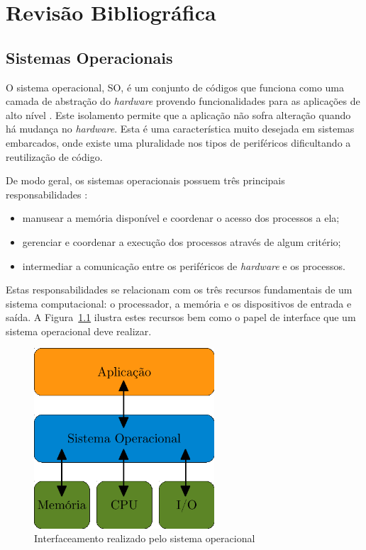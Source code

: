 \documentclass[12pt,openright,oneside,a4paper,brazil]{abntex2}
\begin{document}
\chapter{Revisão Bibliográfica}


\section{Sistemas Operacionais}

O sistema operacional, SO, é um conjunto de códigos que funciona como uma camada de abstração do \textit{hardware} provendo funcionalidades para as aplicações de alto nível \cite{wulf1974hydra}. Este isolamento permite que a aplicação não sofra alteração quando há mudança no \textit{hardware}. Esta é uma característica muito desejada em sistemas embarcados, onde existe uma pluralidade nos tipos de periféricos dificultando a reutilização de código.

De modo geral, os sistemas operacionais possuem três principais responsabilidades \cite{silberschatz2009operating}:

\begin{itemize}
	\item manusear a memória disponível e coordenar o acesso dos processos a ela;
	\item gerenciar e coordenar a execução dos processos através de algum critério;
	\item intermediar a comunicação entre os periféricos de \textit{hardware} e os processos.
\end{itemize}

Estas responsabilidades se relacionam com os três recursos fundamentais de um sistema computacional: o processador, a memória e os dispositivos de entrada e saída. A Figura~\ref{fig:kernel_int} ilustra estes recursos bem como o papel de interface que um sistema operacional deve realizar.

\begin{figure}[htbp]
	\begin{center}
	\includegraphics[width=0.6\textwidth]{img/interfaceKernel.pdf}
	\caption{Interfaceamento realizado pelo sistema operacional}
	\label{fig:kernel_int}
	\end{center}
\end{figure}
\end{document}
